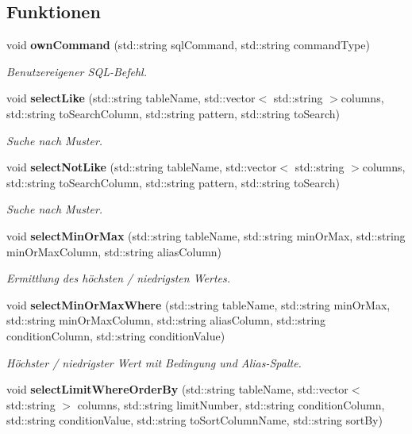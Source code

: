 \subsection*{Funktionen}
\begin{DoxyCompactItemize}
\item 
void \textbf{ own\+Command} (std\+::string sql\+Command, std\+::string command\+Type)
\begin{DoxyCompactList}\small\item\em Benutzereigener S\+Q\+L-\/\+Befehl. \end{DoxyCompactList}\item 
void \textbf{ select\+Like} (std\+::string table\+Name, std\+::vector$<$ std\+::string $>$columns, std\+::string to\+Search\+Column, std\+::string pattern, std\+::string to\+Search)
\begin{DoxyCompactList}\small\item\em Suche nach Muster. \end{DoxyCompactList}\item 
void \textbf{ select\+Not\+Like} (std\+::string table\+Name, std\+::vector$<$ std\+::string $>$columns, std\+::string to\+Search\+Column, std\+::string pattern, std\+::string to\+Search)
\begin{DoxyCompactList}\small\item\em Suche nach Muster. \end{DoxyCompactList}\item 
void \textbf{ select\+Min\+Or\+Max} (std\+::string table\+Name, std\+::string min\+Or\+Max, std\+::string min\+Or\+Max\+Column, std\+::string alias\+Column)
\begin{DoxyCompactList}\small\item\em Ermittlung des höchsten / niedrigsten Wertes. \end{DoxyCompactList}\item 
void \textbf{ select\+Min\+Or\+Max\+Where} (std\+::string table\+Name, std\+::string min\+Or\+Max, std\+::string min\+Or\+Max\+Column, std\+::string alias\+Column, std\+::string condition\+Column, std\+::string condition\+Value)
\begin{DoxyCompactList}\small\item\em Höchster / niedrigster Wert mit Bedingung und Alias-\/\+Spalte. \end{DoxyCompactList}\item 
void \textbf{ select\+Limit\+Where\+Order\+By} (std\+::string table\+Name, std\+::vector$<$ std\+::string $>$ columns, std\+::string limit\+Number, std\+::string condition\+Column, std\+::string condition\+Value, std\+::string to\+Sort\+Column\+Name, std\+::string sort\+By)

\end{DoxyCompactItemize}
